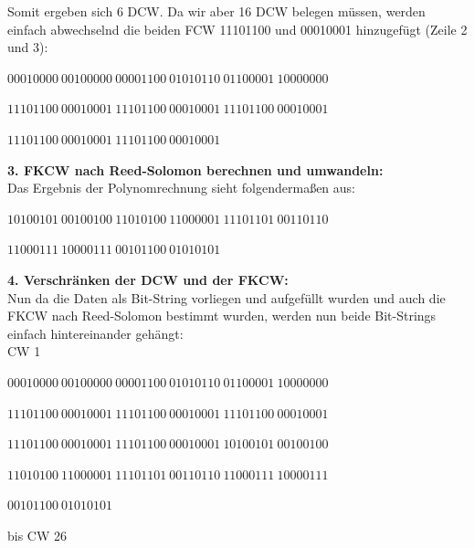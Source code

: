 Somit ergeben sich 6 DCW. Da wir aber 16 DCW belegen müssen, werden einfach abwechselnd die beiden FCW 11101100 und 00010001 hinzugefügt (Zeile 2 und 3):~\\
\centerline{$00010000~00100000~00001100~01010110~01100001~10000000$}
\centerline{$11101100~00010001~11101100~00010001~11101100~00010001$}
\centerline{$11101100~00010001~11101100~00010001~~~~~~~~~~~~~~~~~~~~~~~~~~$}
 
\textbf{3. FKCW nach Reed-Solomon berechnen und umwandeln:}\\
Das Ergebnis der Polynomrechnung sieht folgendermaßen aus:\hfill ~\\
\centerline{$10100101~00100100~11010100~11000001~11101101~00110110$}
\centerline{$11000111~10000111~00101100~01010101~~~~~~~~~~~~~~~~~~~~~~~~~~$}

\textbf{4. Verschränken der DCW und der FKCW:}\\
Nun da die Daten als Bit-String vorliegen und aufgefüllt wurden und auch die FKCW nach Reed-Solomon bestimmt wurden, werden nun beide Bit-Strings einfach hintereinander gehängt:\\
CW 1\\
\centerline{$00010000~00100000~00001100~01010110~01100001~10000000$}
\centerline{$11101100~00010001~11101100~00010001~11101100~00010001$}
\centerline{$11101100~00010001~11101100~00010001~10100101~00100100$}
\centerline{$11010100~11000001~11101101~00110110~11000111~10000111$}
\centerline{$00101100~01010101~~~~~~~~~~~~~~~~~~~~~~~~~~~~~~~~~~~~~~~~~~~~~~~~~~~~$}
bis CW 26

